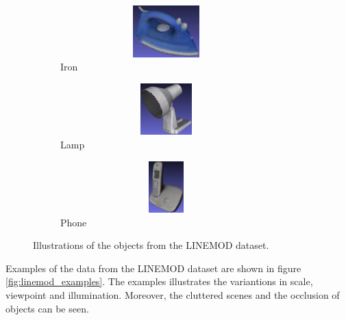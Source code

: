 \documentclass[../main.tex]{subfiles}
\begin{document}
\begin{figure}[H]
    \begin{subfigure}[t]{0.19\textwidth}
        \centering
        \captionsetup{width=.9\textwidth}
        \includegraphics[width=0.9\textwidth, height=20mm, keepaspectratio]{figures/linemod/iron_obj13.png}
        \caption{Iron}
        \label{subfig:obj_iron}
    \end{subfigure}
    \begin{subfigure}[t]{0.19\textwidth}
        \centering
        \captionsetup{width=.9\textwidth}
        \includegraphics[width=0.9\textwidth, height=20mm, keepaspectratio]{figures/linemod/lamp_obj14.png}
        \caption{Lamp}
        \label{subfig:obj_lamp}
    \end{subfigure}
    \begin{subfigure}[t]{0.19\textwidth}
        \centering
        \captionsetup{width=.9\textwidth}
        \includegraphics[width=0.9\textwidth, height=20mm, keepaspectratio]{figures/linemod/phone_obj15.png}
        \caption{Phone}
        \label{subfig:obj_phone}
    \end{subfigure}
    \caption{Illustrations of the objects from the LINEMOD dataset.}
    \label{fig:linemod_objects}
\end{figure}

Examples of the data from the LINEMOD dataset are shown in figure \ref{fig:linemod_examples}. The examples illustrates the variantions in scale, viewpoint and illumination. Moreover, the cluttered scenes and the occlusion of objects can be seen. 
\end{document}
